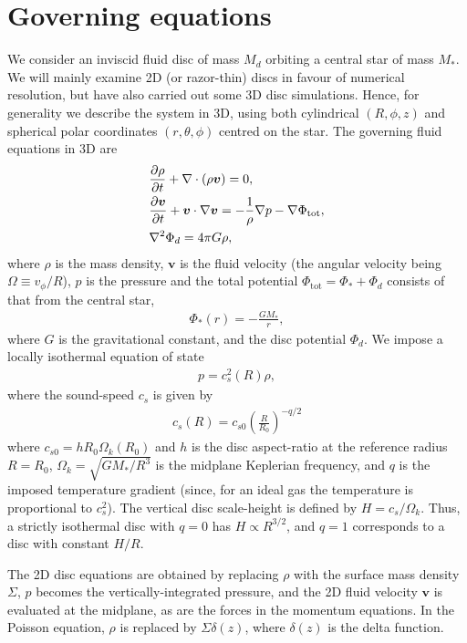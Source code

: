 \section{Governing equations}\label{model} 
We consider an inviscid fluid disc of mass $M_d$ 
orbiting a central star of mass $M_*$. We will mainly examine 2D
(or razor-thin) discs in favour of numerical 
resolution, but have also carried out some 3D disc
simulations. Hence, for generality we describe the system in
3D, using both cylindrical $(R,\phi,z)$ and spherical polar
coordinates $(r,\theta,\phi)$ centred on the star. 
The governing fluid equations in 3D are  
\begin{align}
  &\frac{\partial\rho}{\partial t} + \nabla\cdot\left(\rho\bm{v}\right) =
  0,\label{cont_eq}\\
  &\frac{\partial\bm{v}}{\partial t} + \bm{v}\cdot\nabla\bm{v} = -\frac{1}{\rho}\nabla
  p -\nabla \Phi_\mathrm{tot}\label{mom_eq},\\ 
  & \nabla^2\Phi_d = 4 \pi G \rho \label{poisson}, 
\end{align}
where $\rho$ is the mass density, $\bm{v}$ is the 
fluid velocity (the angular velocity being $\Omega \equiv v_\phi/R$), 
$p$ is the pressure and the total potential
$\Phi_\mathrm{tot} = \Phi_* + \Phi_d$ consists of that from the
central star, 
\begin{align}
  \Phi_*(r) = -\frac{GM_*}{r}, 
\end{align}
where $G$ is the gravitational constant,  and the disc potential
$\Phi_d$. We impose a locally isothermal equation of state 
\begin{align}
  p = c_s^2(R)\rho,
\end{align}
where the sound-speed $c_s$ is given by 
\begin{align}\label{sound-speed}
  c_s(R) = c_{s0}\left(\frac{R}{R_0}\right)^{-q/2}
\end{align}
where $c_{s0} = h R_0\Omega_k(R_0)$ and 
$h$ is the disc aspect-ratio at the reference radius $R=R_0$, 
$\Omega_k=\sqrt{GM_*/R^3}$ is the midplane Keplerian frequency, and
$q$ is the imposed temperature gradient (since, for an ideal gas the
temperature is proportional to $c_s^2$). The vertical disc scale-height is
defined by $H=c_s/\Omega_k$. Thus, a strictly isothermal disc with
$q=0$ has $H\propto R^{3/2}$, and $q=1$ corresponds to a 
 disc with constant $H/R$. 



The 2D disc equations are obtained by replacing $\rho$ with the surface
mass density $\Sigma$, $p$ becomes the vertically-integrated pressure, 
and the 2D fluid velocity $\bm{v}$ is evaluated at the midplane, as are
the forces in the momentum equations. In the Poisson equation, $\rho$ is
replaced by $\Sigma\delta(z)$, where $\delta(z)$ is the
delta function. 




